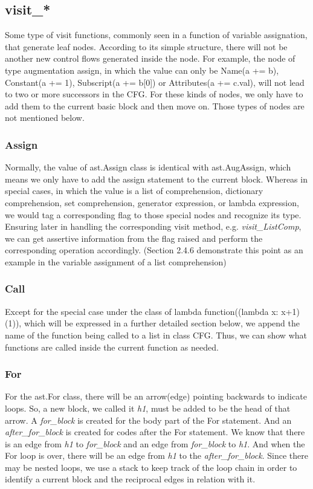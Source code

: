 \documentclass[11pt]{article}
\begin{document}
\subsection{visit\_*}
Some type of visit functions, commonly seen in a function of variable assignation, that generate leaf nodes. According to its simple structure, there will not be another new control flows generated inside the node. For example, the node of type augmentation assign, in which the value can only be Name(a += b), Constant(a += 1), Subscript(a += b[0]) or Attributes(a += c.val), will not lead to two or more successors in the CFG. For these kinds of nodes, we only have to add them to the current basic block and then move on. Those types of nodes are not mentioned below.

\subsubsection{Assign}
Normally, the value of ast.Assign class is identical with ast.AugAssign, which means we only have to add the assign statement to the current block. Whereas in special cases, in which the value is a list of comprehension, dictionary comprehension, set comprehension, generator expression, or lambda expression, we would tag a corresponding flag to those special nodes and recognize its type. Ensuring later in handling the corresponding visit method, e.g. \textit{visit\_ListComp}, we can get assertive information from the flag raised and perform the corresponding operation accordingly. (Section 2.4.6 demonstrate this point as an example in the variable assignment of a list comprehension)

\subsubsection{Call}
Except for the special case under the class of lambda function((lambda x: x+1)(1)), which will be expressed in a further detailed section below, we append the name of the function being called to a list in class CFG. Thus, we can show what functions are called inside the current function as needed.

\subsubsection{For}
For the ast.For class, there will be an arrow(edge) pointing backwards to indicate loops. So, a new block, we called it \textit{h1}, must be added to be the head of that arrow. A \textit{for\_block} is created for the body part of the For statement. And an \textit{after\_for\_block} is created for codes after the For statement. We know that there is an edge from \textit{h1} to \textit{for\_block} and an edge from \textit{for\_block} to \textit{h1}. And when the For loop is over, there will be an edge from \textit{h1} to the \textit{after\_for\_block}. Since there may be nested loops, we use a stack to keep track of the loop chain in order to identify a current block and the reciprocal edges in relation with it.
\end{document}
